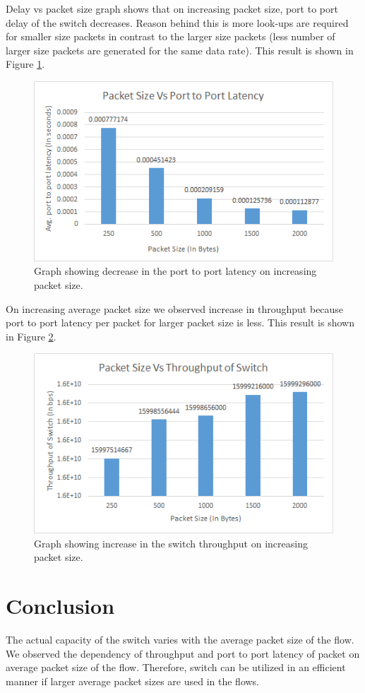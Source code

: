 \documentclass[twocolumn,10pt]{article}
\begin{document}
Delay vs packet size graph shows that on increasing packet size, port to port delay of the switch decreases. 
Reason behind this is more look-ups are required for smaller size packets in contrast to the larger size packets (less number of larger size packets are generated for the same data rate).
This result is shown in Figure \ref{Fig 1}.
\begin{figure}[h]
\centering
\includegraphics[width=0.95\linewidth]{latency.png}
\caption{Graph showing decrease in the port to port latency on increasing packet size.}
\label{Fig 1}
\end{figure}

On increasing average packet size we observed increase in throughput because port to port latency per packet for larger packet size is less.
This result is shown in Figure \ref{Fig 2}.
\begin{figure}[h]
\centering
\includegraphics[width=0.95\linewidth]{throughput.png}
\caption{Graph showing increase in the switch throughput on increasing packet size.}
\label{Fig 2}
\end{figure}

\section{Conclusion}
The actual capacity of the switch varies with the average packet size of the flow. We observed the dependency of throughput and port to port latency of packet on average packet size of the flow.
Therefore, switch can be utilized in an efficient manner if larger average packet sizes are used in the flows.
\end{document}
